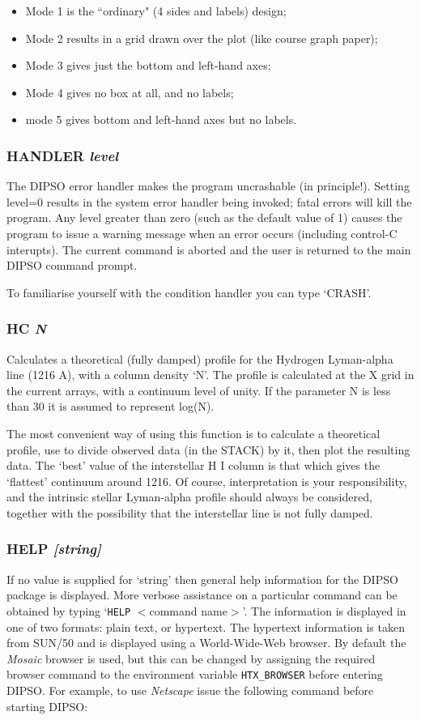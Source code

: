 \documentclass[twoside,11pt,noabs,nolof]{starlink}
\providecommand{\dipcom}[3]{\subsubsection*{\label{COM:#1}\textbf{#1} \emph{#2}}}
\begin{document}
\begin{itemize}
\item Mode 1 is the ``ordinary" (4 sides and labels) design;
\item Mode 2 results in a grid drawn over the plot (like course graph paper);
\item Mode 3 gives just the bottom and left-hand axes;
\item Mode 4 gives no box at all, and no labels;
\item mode 5 gives bottom and left-hand axes but no labels.
\end{itemize}

\dipcom{HANDLER}{level}{Switches the DIPSO error handler on and off}
The DIPSO error handler makes the program uncrashable (in principle!). Setting
level=0 results in the system error handler being invoked; fatal errors will
kill the program. Any level greater than zero (such as the default value of 1)
causes the
program to issue a warning message when an error occurs (including control-C
interupts). The current command is aborted and the user is returned to the main
DIPSO command prompt.

To familiarise yourself with the condition handler you can type `CRASH'.


\dipcom{HC}{N}{Creates a theoretical profile for the Hydrogen Lyman-alpha line}
Calculates a theoretical (fully damped) profile for the Hydrogen
Lyman-alpha line (1216 A), with a column density `N'. The profile is
calculated at the X grid in the current arrays, with a continuum level
of unity. If the parameter N is less than 30 it is assumed to
represent log(N).

The most convenient way of using this function is to calculate a
theoretical profile, use   to divide observed data (in the STACK)
by it, then plot the resulting data. The `best' value of the
interstellar H I column is that which gives the `flattest' continuum
around 1216. Of course, interpretation is your responsibility, and the
intrinsic stellar Lyman-alpha profile should always be considered,
together with the possibility that the interstellar line is not fully
damped.

\dipcom{HELP}{[string]}{Displays full help on specified commands}
If no value is supplied for `string' then general help information for
the DIPSO package is displayed. More verbose assistance on a particular
command can be obtained by typing `{\texttt{HELP} $<$command name$>$}'. The
information is displayed in one of two formats: plain text, or hypertext.
The hypertext information is taken from SUN/50 and is displayed using a
World-Wide-Web browser. By default the \emph{Mosaic} browser is used, but
this can be changed by assigning the required browser command to the
environment variable \texttt{HTX\_BROWSER} before entering DIPSO. For
example, to use \emph{Netscape} issue the following command before
starting DIPSO:
\end{document}
